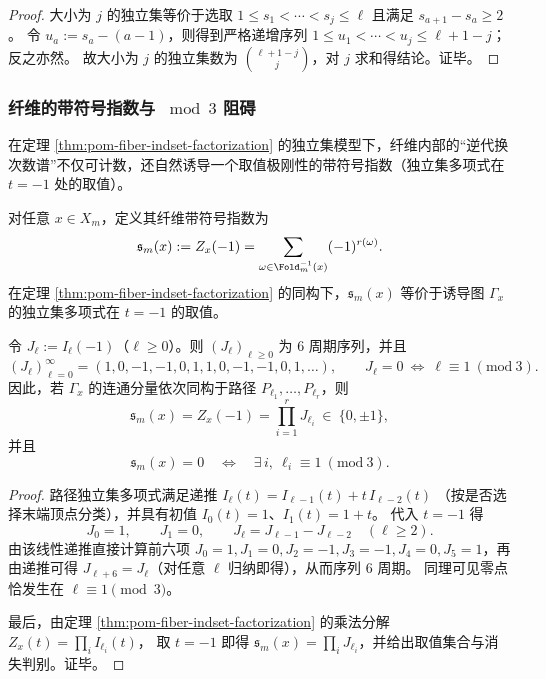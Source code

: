 \begin{proof}
大小为 \(j\) 的独立集等价于选取 \(1\le s_1<\cdots<s_j\le \ell\) 且满足 \(s_{a+1}-s_a\ge 2\)。
令 \(u_a:=s_a-(a-1)\)，则得到严格递增序列 \(1\le u_1<\cdots<u_j\le \ell+1-j\)；反之亦然。
故大小为 \(j\) 的独立集数为 \(\binom{\ell+1-j}{j}\)，对 \(j\) 求和得结论。证毕。
\end{proof}

\subsubsection{纤维的带符号指数与 \texorpdfstring{$\bmod 3$}{mod 3} 阻碍}\label{subsec:pom-fiber-signed-index}
在定理 \ref{thm:pom-fiber-indset-factorization} 的独立集模型下，纤维内部的“逆代换次数谱”不仅可计数，还自然诱导一个取值极刚性的带符号指数（独立集多项式在 \(t=-1\) 处的取值）。

\begin{definition}[纤维的带符号指数]\label{def:pom-fiber-signed-index}
对任意 \(x\in X_m\)，定义其纤维带符号指数为
\[
\mathfrak{s}_m(x):=Z_x(-1)=\sum_{\omega\in\Fold_m^{-1}(x)}(-1)^{r(\omega)}.
\]
在定理 \ref{thm:pom-fiber-indset-factorization} 的同构下，\(\mathfrak{s}_m(x)\) 等价于诱导图 \(\Gamma_x\) 的独立集多项式在 \(t=-1\) 的取值。
\end{definition}

\begin{theorem}[分量级周期律与消失判别]\label{thm:pom-fiber-signed-index-periodicity}
令 \(J_\ell:=I_\ell(-1)\)（\(\ell\ge 0\)）。则 \((J_\ell)_{\ell\ge 0}\) 为 \(6\) 周期序列，并且
\[
(J_\ell)_{\ell=0}^{\infty}=(1,0,-1,-1,0,1,1,0,-1,-1,0,1,\dots),
\qquad
J_\ell=0\ \Longleftrightarrow\ \ell\equiv 1\ (\mathrm{mod}\ 3).
\]
因此，若 \(\Gamma_x\) 的连通分量依次同构于路径 \(P_{\ell_1},\dots,P_{\ell_r}\)，则
\[
\mathfrak{s}_m(x)=Z_x(-1)=\prod_{i=1}^r J_{\ell_i}\ \in\ \{0,\pm 1\},
\]
并且
\[
\mathfrak{s}_m(x)=0
\quad\Longleftrightarrow\quad
\exists\,i,\ \ell_i\equiv 1\ (\mathrm{mod}\ 3).
\]
\end{theorem}

\begin{proof}
路径独立集多项式满足递推
\(
I_\ell(t)=I_{\ell-1}(t)+t\,I_{\ell-2}(t)
\)
（按是否选择末端顶点分类），并具有初值 \(I_0(t)=1\)、\(I_1(t)=1+t\)。
代入 \(t=-1\) 得
\[
J_0=1,\qquad J_1=0,\qquad J_\ell=J_{\ell-1}-J_{\ell-2}\quad(\ell\ge 2).
\]
由该线性递推直接计算前六项
\(
J_0=1,J_1=0,J_2=-1,J_3=-1,J_4=0,J_5=1
\)，再由递推可得 \(J_{\ell+6}=J_\ell\)（对任意 \(\ell\) 归纳即得），从而序列 \(6\) 周期。
同理可见零点恰发生在 \(\ell\equiv 1\pmod 3\)。
\par
最后，由定理 \ref{thm:pom-fiber-indset-factorization} 的乘法分解
\(
Z_x(t)=\prod_i I_{\ell_i}(t)
\)，
取 \(t=-1\) 即得 \(\mathfrak{s}_m(x)=\prod_i J_{\ell_i}\)，并给出取值集合与消失判别。证毕。
\end{proof}

